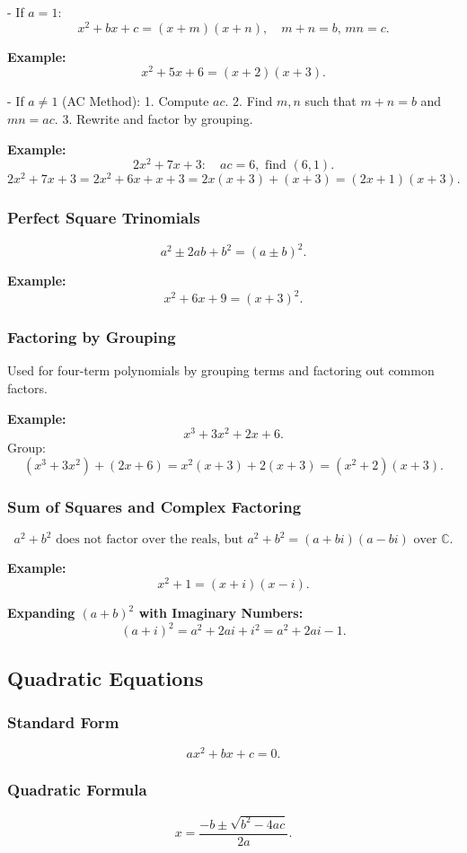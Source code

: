 \documentclass{article}
\begin{document}
\begin{multicols}{2}
- If \(a=1\):
\[
x^2 + bx + c = (x+m)(x+n), \quad m+n=b, \, mn=c.
\]

\textbf{Example:}
\[
x^2 + 5x + 6 = (x+2)(x+3).
\]

- If \(a \neq 1\) (AC Method):
1. Compute \(ac\).
2. Find \(m,n\) such that \(m+n=b\) and \(mn=ac\).
3. Rewrite and factor by grouping.

\textbf{Example:}
\[
2x^2+7x+3: \quad ac=6, \text{ find }(6,1).
\]
\[
2x^2+7x+3=2x^2+6x+x+3=2x(x+3)+(x+3)=(2x+1)(x+3).
\]

\subsubsection*{Perfect Square Trinomials}
\[
a^2 \pm 2ab + b^2 = (a \pm b)^2.
\]

\textbf{Example:}
\[
x^2+6x+9=(x+3)^2.
\]

\subsubsection*{Factoring by Grouping}
Used for four-term polynomials by grouping terms and factoring out common factors.

\textbf{Example:}
\[
x^3+3x^2+2x+6.
\]
Group:
\[
(x^3+3x^2)+(2x+6)=x^2(x+3)+2(x+3)=(x^2+2)(x+3).
\]

\subsubsection*{Sum of Squares and Complex Factoring}
\[
a^2+b^2 \text{ does not factor over the reals, but } a^2+b^2=(a+bi)(a-bi) \text{ over } \mathbb{C}.
\]

\textbf{Example:} 
\[
x^2+1=(x+i)(x-i).
\]

\textbf{Expanding $(a+b)^2$ with Imaginary Numbers:}
\[
(a+i)^2 = a^2 + 2ai + i^2 = a^2 + 2ai - 1.
\]

\subsection*{Quadratic Equations}

\subsubsection*{Standard Form}
\[
ax^2+bx+c=0.
\]

\subsubsection*{Quadratic Formula}
\[
x=\frac{-b \pm \sqrt{b^2-4ac}}{2a}.
\]


\end{multicols}
\end{document}
